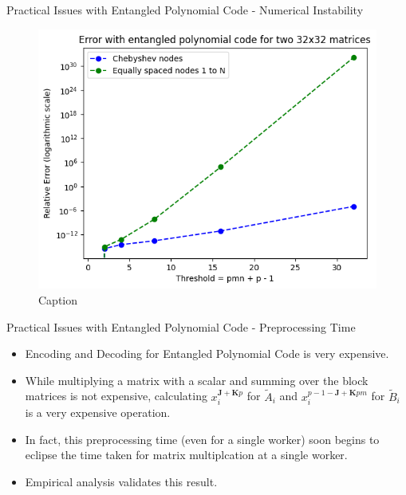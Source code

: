 \documentclass{beamer}
\begin{document}
\begin{frame}{Practical Issues with Entangled Polynomial Code - Numerical Instability}
    \begin{figure}[H]
        \centering
        \includegraphics[scale=0.5]{../plots/error_vs_threshold.png}
        \caption{Caption}
    \end{figure}
\end{frame}

\begin{frame}{Practical Issues with Entangled Polynomial Code - Preprocessing Time}
    \begin{itemize}
        \item Encoding and Decoding for Entangled Polynomial Code is very expensive.
        \item While multiplying a matrix with a scalar and summing over the block matrices is not expensive, calculating $x_{i}^{\mathbf{J} + \mathbf{K}p}$ for $\tilde{A}_{i}$ and $x_{i}^{p-1-\mathbf{J}+\mathbf{K}pm}$ for $\tilde{B}_{i}$ is a very expensive operation.
        \item In fact, this preprocessing time (even for a single worker) soon begins to eclipse the time taken for matrix multiplcation at a single worker.
        \item Empirical analysis validates this result.
    \end{itemize}
\end{frame}
\end{document}
